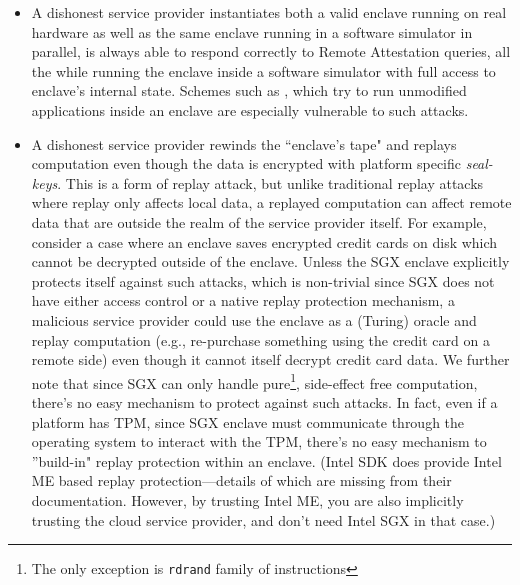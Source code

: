 \documentclass[11pt]{article}
\begin{document}
    \begin{itemize}
        \item A dishonest service provider instantiates both a valid
          enclave running on real hardware as well as the same enclave
          running in a software simulator in parallel, is always able
          to respond correctly to Remote Attestation queries, all the
          while running the enclave inside a software simulator with
          full access to enclave's internal state. Schemes such as
          \cite{Haven, Graphene, Scone}, which try to run unmodified
          applications inside an enclave are especially vulnerable to
          such attacks.

        \item A dishonest service provider rewinds the ``enclave's
          tape" and replays computation even though the data is
          encrypted with platform specific
          \textit{seal-keys}\cite{sgxattest}. This is a form of replay
          attack, but unlike traditional replay attacks where replay
          only affects local data, a replayed computation can affect
          remote data that are outside the realm of the service
          provider itself. For example, consider a case where an
          enclave saves encrypted credit cards on disk which cannot be
          decrypted outside of the enclave. Unless the SGX enclave
          explicitly protects itself against such attacks, which is
          non-trivial since SGX does not have either access control or
          a native replay protection mechanism, a malicious service
          provider could use the enclave as a (Turing) oracle and
          replay computation (e.g., re-purchase something using the
          credit card on a remote side) even though it cannot itself
          decrypt credit card data. We further note that since SGX can
          only handle pure\footnote{The only exception is
            \texttt{rdrand} family of instructions}, side-effect free
          computation, there's no easy mechanism to protect against
          such attacks. In fact, even if a platform has TPM, since SGX
          enclave must communicate through the operating system to
          interact with the TPM, there's no easy mechanism to
          ''build-in" replay protection within an enclave. (Intel SDK
          does provide Intel ME based replay protection---details of
          which are missing from their documentation. However, by
          trusting Intel ME, you are also implicitly trusting the
          cloud service provider, and don't need Intel SGX in that
          case.)


\end{itemize}
\end{document}
